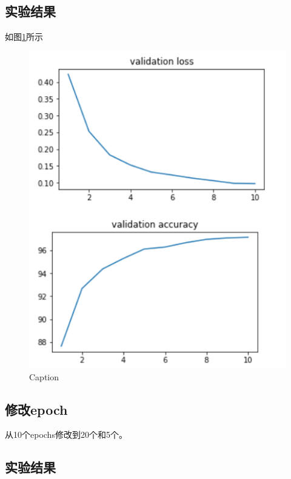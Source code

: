\documentclass[UTF8,a4paper,10pt]{ctexart}
\begin{document}
\subsection{实验结果}

如图\ref{fig:1}所示
\begin{figure}[H]
    \centering
    \includegraphics[scale=0.3]{2.png}
    \caption{Caption}
    \label{fig:1}
\end{figure}




\subsection{修改epoch}
从10个epochs修改到20个和5个。

\subsection{实验结果}
\end{document}
